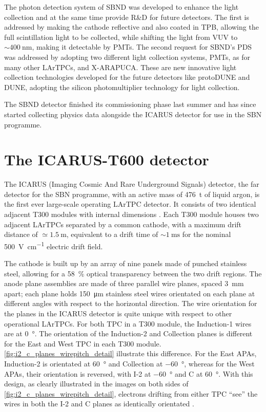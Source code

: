 The photon detection system of SBND was developed to enhance the light collection and at the same time provide R\&D for future detectors. The first is addressed by making the cathode reflective and also coated in TPB, allowing the full scintillation light to be collected, while shifting the light from VUV to $\sim\SI{400}{\nm}$, making it detectable by PMTs. The second request for SBND's PDS was addressed by adopting two different light collection systems, PMTs, as for many other LArTPCs, and X-ARAPUCA. These are new innovative light collection technologies developed for the future detectors like protoDUNE and DUNE, adopting the silicon photomultiplier technology for light collection. 

The SBND detector finished its commissioning phase last summer and has since started collecting physics data alongside the ICARUS detector for use in the SBN programme. 

\section{The ICARUS-T600 detector}  \label{sec:ICARUS_T600}

The ICARUS (Imaging Cosmic And Rare Underground Signals) detector, the far detector for the SBN programme, with an active mass of \SI{476}{\tonne} of liquid argon, is the first ever large-scale operating LArTPC detector. It consists of two identical adjacent T300 modules with internal dimensions . Each T300 module houses two adjacent LArTPCs separated by a common cathode, with a maximum drift distance of $\simeq\SI{1.5}{\m}$, equivalent to a drift time of $\sim\SI{1}{\ms}$ for the nominal \SI{500}{\volt\per\cm} electric drift field.

The cathode is built up by an array of nine panels made of punched stainless steel, allowing for a \SI{58}{\percent} optical transparency between the two drift regions. The anode plane assemblies are made of three parallel wire planes, spaced \SI{3}{\mm} apart; each plane holds \SI{150}{\um} stainless steel wires orientated on each plane at different angles with respect to the horizontal direction. The wire orientation for the planes in the ICARUS detector is quite unique with respect to other operational LArTPCs. For both TPC in a T300 module, the Induction-1 wires are at \SI{0}{\degree}. The orientation of the  Induction-2 and Collection planes is different for the East and West TPC in each T300 module. \autoref{fig:i2_c_planes_wirepitch_detail} illustrate this difference. For the East APAs, Induction-2 is orientated at \SI{+60}{\degree} and Collection at \SI{-60}{\degree}, whereas for the West APAs, their orientation is reversed, with I-2 at \SI{-60}{\degree} and C at \SI{+60}{\degree}. With this design, as clearly illustrated in the images on both sides of \autoref{fig:i2_c_planes_wirepitch_detail}, electrons drifting from either TPC ``see'' the wires in both the I-2 and C planes as identically orientated \cite{amerioDesignConstructionTests2004c}. 

